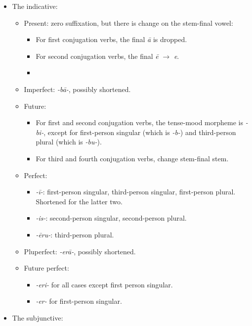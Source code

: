 \documentclass[a4paper, oneside]{report}
\newcommand{\form}[1]{\emph{#1}}
\begin{document}
\begin{itemize}
    \item The indicative:
    \begin{itemize}
        \item Present: zero suffixation, but there is change on the stem-final vowel:
        \begin{itemize}
            \item For first conjugation verbs, the final \form{\={a}} is dropped.
            \item For second conjugation verbs, the final \form{\={e}} $\to$ \form{e}.
            \item  
        \end{itemize}
        \item Imperfect: \form{-b\={a}-}, possibly shortened.
        \item Future: 
        \begin{itemize}
            \item For first and second conjugation verbs, 
            the tense-mood morpheme is \form{-bi-}, except for 
            first-person singular (which is \form{-b-})
            and third-person plural (which is \form{-bu-}).
            \item For third and fourth conjugation verbs, change stem-final stem.
        \end{itemize}
        \item Perfect: 
        \begin{itemize}
            \item \form{-ī-}: first-person singular, third-person singular, first-person plural.
            Shortened for the latter two.
            \item \form{-is-}: second-person singular, second-person plural.
            \item \form{-\={e}ru-}: third-person plural.
        \end{itemize}
        \item Pluperfect: \form{-er\={a}-}, possibly shortened.
        \item Future perfect: 
        \begin{itemize}
            \item \form{-eri-} for all cases except first person singular.
            \item \form{-er-} for first-person singular.
        \end{itemize}
    \end{itemize}
    \item The subjunctive:

\end{itemize}
\end{document}
